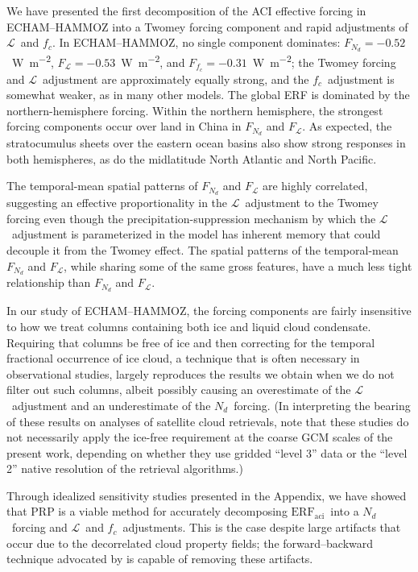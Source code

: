 \documentclass[acp, manuscript]{copernicus}\usepackage[]{graphicx}\usepackage[]{color}
\newcommand\nd{\ensuremath{N_d}}
\newcommand\lwp{\ensuremath{\mathcal L}}
\newcommand\fc{\ensuremath{f_c}}
\newcommand\cf{\fc}
\newcommand\erfaci{\ensuremath{\text{ERF}_\text{aci}}}
\begin{document}
\conclusions %
We have presented the first decomposition of the ACI effective forcing in
ECHAM--HAMMOZ into a Twomey forcing component and rapid adjustments of \lwp\ and
\fc.  In ECHAM--HAMMOZ, no single component dominates:
$F_{\nd} = -0.52$~\unit{W~m^{-2}}, $F_{\lwp} = -0.53$~\unit{W~m^{-2}}, and
$F_{\fc} = -0.31$~\unit{W~m^{-2}}; the Twomey forcing and \lwp\ adjustment are
approximately equally strong, and the \cf\ adjustment is somewhat weaker, as in
many other models.  The global ERF is dominated by the northern-hemisphere
forcing.  Within the northern hemisphere, the strongest forcing components occur
over land in China in $F_{\nd}$ and $F_{\lwp}$.  As expected, the stratocumulus
sheets over the eastern ocean basins also show strong responses in both
hemispheres, as do the midlatitude North Atlantic and North Pacific.

The temporal-mean spatial patterns of $F_{\nd}$ and $F_{\lwp}$ are highly
correlated, suggesting an effective proportionality in the \lwp\ adjustment to
the Twomey forcing even though the precipitation-suppression mechanism by which
the \lwp\ adjustment is parameterized in the model has inherent memory that
could decouple it from the Twomey effect.  The spatial patterns
of the temporal-mean $F_{\nd}$ and $F_{\lwp}$, while sharing some of the same
gross features, have a much less tight relationship than $F_{\nd}$ and
$F_{\lwp}$.

In our study of ECHAM--HAMMOZ, the forcing components are fairly insensitive to
how we treat columns containing both ice and liquid cloud condensate.  Requiring
that columns be free of ice and then correcting for the temporal fractional
occurrence of ice cloud, a technique that is often necessary in observational
studies, largely reproduces the results we obtain when we do not filter out such
columns, albeit possibly causing an overestimate of the \lwp\ adjustment and an
underestimate of the \nd\ forcing.  (In interpreting the bearing of these
results on analyses of satellite cloud retrievals, note that these studies do
not necessarily apply the ice-free requirement at the coarse GCM scales of the
present work, depending on whether they use gridded ``level 3'' data or the
``level 2'' native resolution of the retrieval algorithms.)

Through idealized sensitivity studies presented in the Appendix, we have showed
that PRP is a viable method for accurately decomposing \erfaci\ into a \nd\
forcing and \lwp\ and \cf\ adjustments.  This is the case despite large
artifacts that occur due to the decorrelated cloud property fields; the
forward--backward technique advocated by \citet{Colman1997} is capable of
removing these artifacts.
\end{document}
